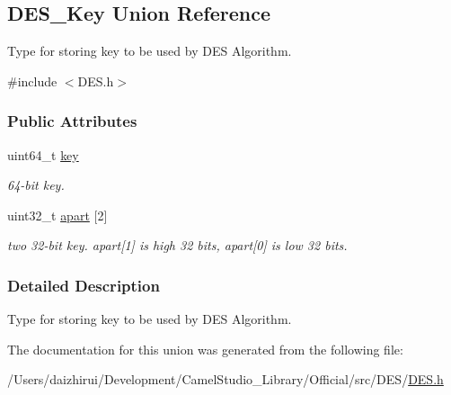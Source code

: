 \hypertarget{a00190}{}\subsection{D\+E\+S\+\_\+\+Key Union Reference}
\label{a00190}


Type for storing key to be used by D\+ES Algorithm.  




{\ttfamily \#include $<$D\+E\+S.\+h$>$}

\subsubsection*{Public Attributes}
\begin{DoxyCompactItemize}
\item 
\mbox{\label{a00190_a48b5dadf7decf3076826072563041f1b}} 
uint64\+\_\+t \mbox{\hyperlink{a00190_a48b5dadf7decf3076826072563041f1b}{key}}
\begin{DoxyCompactList}\small\item\em 64-\/bit key. \end{DoxyCompactList}\item 
\mbox{\label{a00190_a3e14395e8ac22e9e775a243041daaeeb}} 
uint32\+\_\+t \mbox{\hyperlink{a00190_a3e14395e8ac22e9e775a243041daaeeb}{apart}} \mbox{[}2\mbox{]}
\begin{DoxyCompactList}\small\item\em two 32-\/bit key. apart\mbox{[}1\mbox{]} is high 32 bits, apart\mbox{[}0\mbox{]} is low 32 bits. \end{DoxyCompactList}\end{DoxyCompactItemize}


\subsubsection{Detailed Description}
Type for storing key to be used by D\+ES Algorithm. 

The documentation for this union was generated from the following file\+:\begin{DoxyCompactItemize}
\item 
/\+Users/daizhirui/\+Development/\+Camel\+Studio\+\_\+\+Library/\+Official/src/\+D\+E\+S/\mbox{\hyperlink{a00026}{D\+E\+S.\+h}}\end{DoxyCompactItemize}
